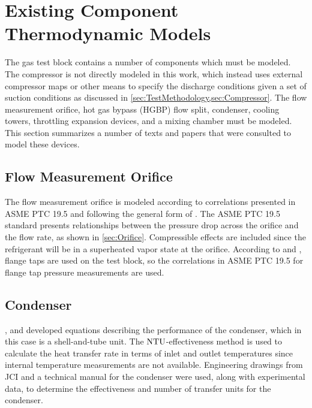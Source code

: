 
\section{Existing Component Thermodynamic Models}
The  gas test block contains a number of components which must be modeled. 
The compressor is not directly modeled in this work, 
which instead uses external compressor maps or other means 
to specify the discharge conditions given a set of suction conditions
as discussed in \cref{sec:TestMethodology,sec:Compressor}. 
The flow measurement orifice, hot gas bypass (HGBP) flow split, condenser, cooling towers, 
throttling expansion devices, and a mixing chamber must be modeled. 
This section summarizes a number of texts and papers that were consulted to model these devices.

\subsection{Flow Measurement Orifice}
The flow measurement orifice is modeled according to correlations presented in 
ASME PTC 19.5 \parencite{ptc19} and following the general form of \textcite{munson2009}. 
The ASME PTC 19.5 standard presents relationships between 
the pressure drop across the orifice and the flow rate, as shown in \cref{sec:Orifice}. 
Compressible effects are included since the refrigerant will be in a 
superheated vapor state at the orifice.
According to \textcite{trevino2012} and \textcite{flow1984}, flange taps
are used on the test block, so the correlations in ASME PTC 19.5
for flange tap pressure measurements are used.

\subsection{Condenser}
\textcites{incropera2007}{incropera1985}, and \textcite{kays1984} 
developed equations describing the performance of the condenser, 
which in this case is a shell-and-tube unit. 
The $\mathrm{NTU}$-effectiveness method is used to calculate the heat transfer rate
in terms of inlet and outlet temperatures since internal temperature measurements are not available. 
Engineering drawings from JCI \parencite{cond1983} and a technical manual
for the condenser \parencite{condman} were used, along with experimental data,
to determine the effectiveness and number of transfer units for the condenser.

